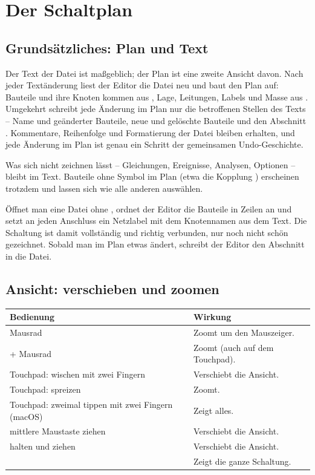 \chapter{Der Schaltplan}
\label{kap:editor-schaltplan}

\section{Grundsätzliches: Plan und Text}

Der Text der Datei ist maßgeblich; der Plan ist eine zweite Ansicht davon.
Nach jeder Textänderung liest der Editor die Datei neu und baut den Plan
auf: Bauteile und ihre Knoten kommen aus , Lage,
Leitungen, Labels und Masse aus . Umgekehrt schreibt jede
Änderung im Plan nur die betroffenen Stellen des Texts – Name und
 geänderter Bauteile, neue und gelöschte Bauteile und den
Abschnitt . Kommentare, Reihenfolge und Formatierung der
Datei bleiben erhalten, und jede Änderung im Plan ist genau ein Schritt der
gemeinsamen Undo-Geschichte.

Was sich nicht zeichnen lässt – Gleichungen, Ereignisse, Analysen,
Optionen – bleibt im Text. Bauteile ohne Symbol im Plan (etwa die Kopplung
) erscheinen trotzdem und lassen sich wie alle anderen auswählen.

\begin{hinweis}
  Öffnet man eine Datei ohne , ordnet der Editor die
  Bauteile in Zeilen an und setzt an jeden Anschluss ein Netzlabel mit dem
  Knotennamen aus dem Text. Die Schaltung ist damit vollständig und richtig
  verbunden, nur noch nicht schön gezeichnet. Sobald man im Plan etwas
  ändert, schreibt der Editor den Abschnitt  in die Datei.
\end{hinweis}

\section{Ansicht: verschieben und zoomen}

\begin{center}
\begin{tabularx}{\textwidth}{@{}P{5.2cm}L@{}}
  \toprule
  Bedienung & Wirkung \\
  \midrule
  Mausrad & Zoomt um den Mauszeiger. \\
   + Mausrad & Zoomt (auch auf dem Touchpad). \\
  Touchpad: wischen mit zwei Fingern & Verschiebt die Ansicht. \\
  Touchpad: spreizen & Zoomt. \\
  Touchpad: zweimal tippen mit zwei Fingern (macOS) & Zeigt alles. \\
  mittlere Maustaste ziehen & Verschiebt die Ansicht. \\
   halten und ziehen & Verschiebt die Ansicht. \\
   & Zeigt die ganze Schaltung. \\
  \bottomrule
\end{tabularx}
\end{center}

